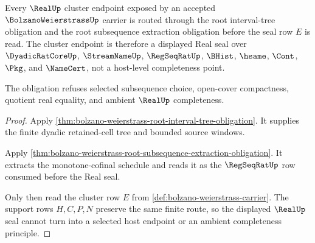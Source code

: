 \begin{theorem}
\label{thm:bolzano-weierstrass-root-real-seal-obligation}
Every $\RealUp$ cluster endpoint exposed by an accepted $\BolzanoWeierstrassUp$ carrier is routed through the root interval-tree obligation and the root subsequence extraction obligation before the seal row $E$ is read. The cluster endpoint is therefore a displayed Real seal over $\DyadicRatCoreUp$, $\StreamNameUp$, $\RegSeqRatUp$, $\BHist$, $\hsame$, $\Cont$, $\Pkg$, and $\NameCert$, not a host-level completeness point.

The obligation refuses selected subsequence choice, open-cover compactness, quotient real equality, and ambient $\RealUp$ completeness.
\end{theorem}
\begin{proof}
Apply \autoref{thm:bolzano-weierstrass-root-interval-tree-obligation}. It supplies the finite dyadic retained-cell tree and bounded source windows.

Apply \autoref{thm:bolzano-weierstrass-root-subsequence-extraction-obligation}. It extracts the monotone-cofinal schedule and reads it as the $\RegSeqRatUp$ row consumed before the Real seal.

Only then read the cluster row $E$ from \autoref{def:bolzano-weierstrass-carrier}. The support rows $H,C,P,N$ preserve the same finite route, so the displayed $\RealUp$ seal cannot turn into a selected host endpoint or an ambient completeness principle.
\end{proof}

